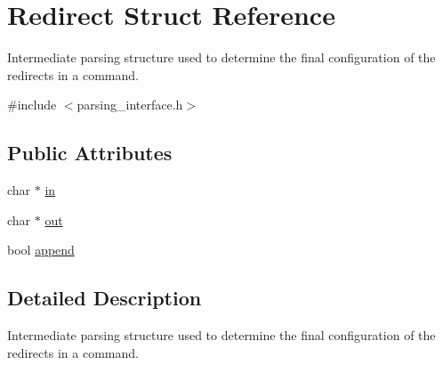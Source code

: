 \hypertarget{structRedirect}{\section{Redirect Struct Reference}
\label{structRedirect}
}


Intermediate parsing structure used to determine the final configuration of the redirects in a command.  




{\ttfamily \#include $<$parsing\-\_\-interface.\-h$>$}

\subsection*{Public Attributes}
\begin{DoxyCompactItemize}
\item 
char $\ast$ \hyperlink{structRedirect_ab0e76f7e58a26d52216c8c4bfc9c2e83}{in}
\item 
char $\ast$ \hyperlink{structRedirect_a9d5efc0a96275e13eba0e71450771952}{out}
\item 
bool \hyperlink{structRedirect_aea1d3bd9c3b6e1dbf1661b616df9818e}{append}
\end{DoxyCompactItemize}


\subsection{Detailed Description}
Intermediate parsing structure used to determine the final configuration of the redirects in a command. 


